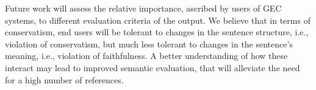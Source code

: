 \documentclass[letter,11pt]{article}
\begin{document}
%
%
%

Future work will assess the relative importance, ascribed by users of GEC systems,
to different evaluation criteria of the output. We believe that in terms of conservatism,
end users will be tolerant to changes in the sentence structure, i.e.,
violation of conservatism, but much less tolerant to changes in the sentence's meaning,
i.e., violation of faithfulness. A better understanding of how these interact
may lead to improved semantic evaluation, that will alleviate the need
for a high number of references.




\end{document}
